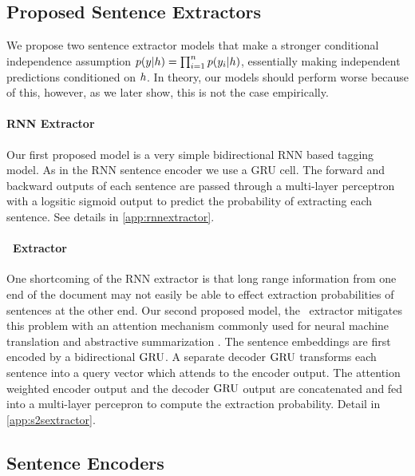 \subsection{Proposed Sentence Extractors}
We propose two sentence extractor models that 
make a stronger conditional independence 
assumption $p(\slabel|\sentEmb)=\prod_{i=1}^\docSize p(\slabel[i]|\sentEmb)$,
essentially making independent predictions conditioned on $\sentEmb$.
In theory, our models should perform worse because of this, however, as
we later show, this is not the case empirically.

\paragraph{RNN Extractor}
    Our first proposed model is a very simple bidirectional
RNN based tagging model. As in the RNN sentence encoder we use a GRU cell.
The forward and backward outputs of each sentence are passed through a 
multi-layer perceptron with a logsitic sigmoid output 
to predict the probability
of extracting each sentence. See details in \autoref{app:rnnextractor}.

\paragraph{\sts~Extractor} One shortcoming of the RNN extractor is that long range
information from one end of the document may not easily be able to effect 
extraction probabilities of sentences at the other end. 
Our second proposed model, the \sts~extractor mitigates this problem with an 
attention 
mechanism commonly
used for neural machine translation \cite{bahdanau2014neural} and 
abstractive summarization \cite{see2017get}. 
The sentence embeddings are first
encoded by a bidirectional $\operatorname{GRU}$. A separate decoder $\operatorname{GRU}$ transforms each 
sentence into a query vector which attends to the encoder output. The
attention weighted encoder output and the decoder $\operatorname{GRU}$ output are concatenated
and fed into a multi-layer percepron to compute the extraction probability.
Detail in \autoref{app:s2sextractor}.


\subsection{Sentence Encoders}



